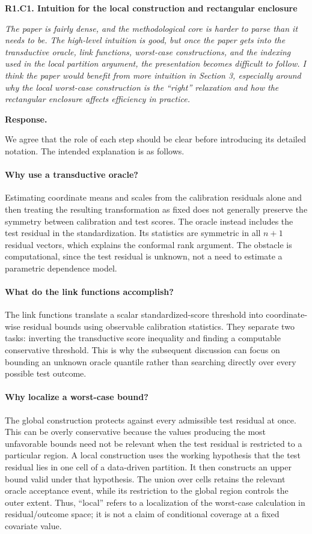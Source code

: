 \documentclass[11pt]{article}
\numberwithin{equation}{section}
\newcommand{\reviewercomment}[2]{%
  \par\medskip\noindent\textbf{#1}\par\nopagebreak
  \begingroup\color{ReviewerBlue}\itshape #2\par\endgroup
  \noindent\textbf{Response.} }
\begin{document}
\reviewercomment{R1.C1. Intuition for the local construction and rectangular enclosure}{%
The paper is fairly dense, and the methodological core is harder to parse
than it needs to be. The high-level intuition is good, but once the paper
gets into the transductive oracle, link functions, worst-case
constructions, and the indexing used in the local partition argument,
the presentation becomes difficult to follow. I think the paper would
benefit from more intuition in Section 3, especially around why the local
worst-case construction is the ``right'' relaxation and how the
rectangular enclosure affects efficiency in practice.}

We agree that the role of each step should be clear before introducing
its detailed notation. The intended explanation is as follows.

\paragraph{Why use a transductive oracle?}
Estimating coordinate means and scales from the calibration residuals
alone and then treating the resulting transformation as fixed does not
generally preserve the symmetry between calibration and test scores.
The oracle instead includes the test residual in the standardization.
Its statistics are symmetric in all $n+1$ residual vectors, which explains
the conformal rank argument. The obstacle is computational, since the
test residual is unknown, not a need to estimate a parametric dependence
model.

\paragraph{What do the link functions accomplish?}
The link functions translate a scalar standardized-score threshold into
coordinate-wise residual bounds using observable calibration statistics.
They separate two tasks: inverting the transductive score inequality and
finding a computable conservative threshold. This is why the subsequent
discussion can focus on bounding an unknown oracle quantile rather than
searching directly over every possible test outcome.

\paragraph{Why localize a worst-case bound?}
The global construction protects against every admissible test residual
at once. This can be overly conservative because the values producing
the most unfavorable bounds need not be relevant when the test residual
is restricted to a particular region. A local construction uses the
working hypothesis that the test residual lies in one cell of a
data-driven partition. It then constructs an upper bound valid under
that hypothesis. The union over cells retains the relevant oracle
acceptance event, while its restriction to the global region controls
the outer extent. Thus, ``local'' refers to a localization of the
worst-case calculation in residual/outcome space; it is not a claim of
conditional coverage at a fixed covariate value.
\end{document}

